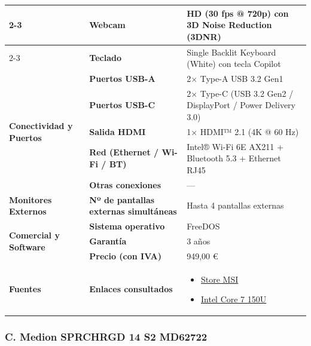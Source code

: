 \documentclass[11.5pt]{article}
\begin{document}
\begin{table}[H]
\begin{tabularx}{\textwidth}{|l|l|X|}
			\cline{2-3}
			& \textbf{Webcam} & HD (30 fps @ 720p) con 3D Noise Reduction (3DNR) \\
			\cline{2-3}
			& \textbf{Teclado} & Single Backlit Keyboard (White) con tecla Copilot \\
			\hline
			\multirow{5}{*}{\textbf{Conectividad y Puertos}} 
			& \textbf{Puertos USB-A} & 2\(\times\) Type-A USB 3.2 Gen1 \\
			\cline{2-3}
			& \textbf{Puertos USB-C} & 2\(\times\) Type-C (USB 3.2 Gen2 / DisplayPort / Power Delivery 3.0) \\
			\cline{2-3}
			& \textbf{Salida HDMI} & 1\(\times\) HDMI™ 2.1 (4K @ 60 Hz) \\
			\cline{2-3}
			& \textbf{Red (Ethernet / Wi-Fi / BT)} & Intel® Wi-Fi 6E AX211 + Bluetooth 5.3 + Ethernet RJ45 \\
			\cline{2-3}
			& \textbf{Otras conexiones} & --- \\
			\hline
			\textbf{Monitores Externos} & \textbf{Nº de pantallas externas simultáneas} & Hasta 4 pantallas externas \\
			\hline
			\multirow{3}{*}{\textbf{Comercial y Software}} 
			& \textbf{Sistema operativo} & FreeDOS \\
			\cline{2-3}
			& \textbf{Garantía} & 3 años \\
			\cline{2-3}
			& \textbf{Precio (con IVA)} & 949,00 € \\
			\hline
			\textbf{Fuentes} & \textbf{Enlaces consultados} & 
			\begin{itemize}[leftmargin=*,nosep]
				\item \href{https://es-store.msi.com/products/modern-15-f1mg-499es-portatiles}{Store MSI}
				\item \href{https://www.geektopia.es/es/product/intel/core-7-150u/}{Intel Core 7 150U}
			\end{itemize} \\
			\hline
		\end{tabularx}
	\end{table}
	
	\subsubsection*{C. Medion SPRCHRGD 14 S2 MD62722}
	
\end{document}
